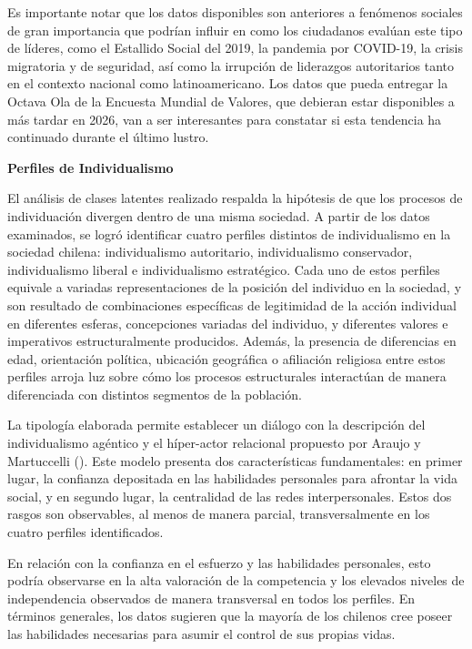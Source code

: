 \documentclass[
  letterpaper,
  DIV=11,
  numbers=noendperiod]{scrartcl}
\begin{document}
Es importante notar que los datos disponibles son anteriores a fenómenos
sociales de gran importancia que podrían influir en como los ciudadanos
evalúan este tipo de líderes, como el Estallido Social del 2019, la
pandemia por COVID-19, la crisis migratoria y de seguridad, así como la
irrupción de liderazgos autoritarios tanto en el contexto nacional como
latinoamericano. Los datos que pueda entregar la Octava Ola de la
Encuesta Mundial de Valores, que debieran estar disponibles a más tardar
en 2026, van a ser interesantes para constatar si esta tendencia ha
continuado durante el último lustro.

\textbf{Perfiles de Individualismo}

El análisis de clases latentes realizado respalda la hipótesis de que
los procesos de individuación divergen dentro de una misma sociedad. A
partir de los datos examinados, se logró identificar cuatro perfiles
distintos de individualismo en la sociedad chilena: individualismo
autoritario, individualismo conservador, individualismo liberal e
individualismo estratégico. Cada uno de estos perfiles equivale a
variadas representaciones de la posición del individuo en la sociedad, y
son resultado de combinaciones específicas de legitimidad de la acción
individual en diferentes esferas, concepciones variadas del individuo, y
diferentes valores e imperativos estructuralmente producidos. Además, la
presencia de diferencias en edad, orientación política, ubicación
geográfica o afiliación religiosa entre estos perfiles arroja luz sobre
cómo los procesos estructurales interactúan de manera diferenciada con
distintos segmentos de la población.

La tipología elaborada permite establecer un diálogo con la descripción
del individualismo agéntico y el híper-actor relacional propuesto por
Araujo y Martuccelli (). Este modelo
presenta dos características fundamentales: en primer lugar, la
confianza depositada en las habilidades personales para afrontar la vida
social, y en segundo lugar, la centralidad de las redes interpersonales.
Estos dos rasgos son observables, al menos de manera parcial,
transversalmente en los cuatro perfiles identificados.

En relación con la confianza en el esfuerzo y las habilidades
personales, esto podría observarse en la alta valoración de la
competencia y los elevados niveles de independencia observados de manera
transversal en todos los perfiles. En términos generales, los datos
sugieren que la mayoría de los chilenos cree poseer las habilidades
necesarias para asumir el control de sus propias vidas.
\end{document}
